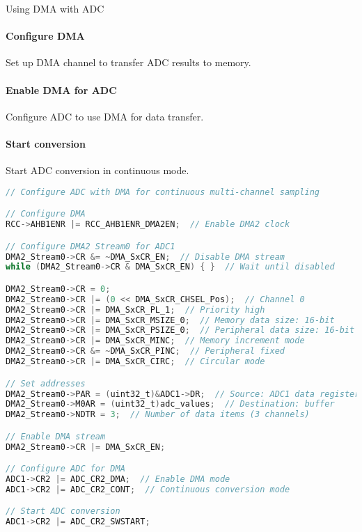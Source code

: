 \begin{KR}{Using DMA with ADC}
\paragraph{Configure DMA}
Set up DMA channel to transfer ADC results to memory.
\paragraph{Enable DMA for ADC}
Configure ADC to use DMA for data transfer.
\paragraph{Start conversion}
Start ADC conversion in continuous mode.

\begin{lstlisting}[language=C, style=basesmol]
// Configure ADC with DMA for continuous multi-channel sampling

// Configure DMA
RCC->AHB1ENR |= RCC_AHB1ENR_DMA2EN;  // Enable DMA2 clock

// Configure DMA2 Stream0 for ADC1
DMA2_Stream0->CR &= ~DMA_SxCR_EN;  // Disable DMA stream
while (DMA2_Stream0->CR & DMA_SxCR_EN) { }  // Wait until disabled

DMA2_Stream0->CR = 0;
DMA2_Stream0->CR |= (0 << DMA_SxCR_CHSEL_Pos);  // Channel 0
DMA2_Stream0->CR |= DMA_SxCR_PL_1;  // Priority high
DMA2_Stream0->CR |= DMA_SxCR_MSIZE_0;  // Memory data size: 16-bit
DMA2_Stream0->CR |= DMA_SxCR_PSIZE_0;  // Peripheral data size: 16-bit
DMA2_Stream0->CR |= DMA_SxCR_MINC;  // Memory increment mode
DMA2_Stream0->CR &= ~DMA_SxCR_PINC;  // Peripheral fixed
DMA2_Stream0->CR |= DMA_SxCR_CIRC;  // Circular mode

// Set addresses
DMA2_Stream0->PAR = (uint32_t)&ADC1->DR;  // Source: ADC1 data register
DMA2_Stream0->M0AR = (uint32_t)adc_values;  // Destination: buffer
DMA2_Stream0->NDTR = 3;  // Number of data items (3 channels)

// Enable DMA stream
DMA2_Stream0->CR |= DMA_SxCR_EN;

// Configure ADC for DMA
ADC1->CR2 |= ADC_CR2_DMA;  // Enable DMA mode
ADC1->CR2 |= ADC_CR2_CONT;  // Continuous conversion mode

// Start ADC conversion
ADC1->CR2 |= ADC_CR2_SWSTART;
\end{lstlisting}
\end{KR}

